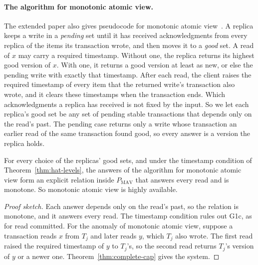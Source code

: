 \paragraph{The algorithm for monotonic atomic view.}
The extended paper also gives pseudocode for monotonic atomic
view~\cite[App.~B]{bailis2013hatextended}.  A replica keeps a write in a
\emph{pending} set until it has received acknowledgments from every replica of
the items its transaction wrote, and then moves it to a \emph{good} set.  A
read of $x$ may carry a required timestamp.  Without one, the replica returns
its highest good version of $x$.  With one, it returns a good version at least
as new, or else the pending write with exactly that timestamp.  After each
read, the client raises the required timestamp of every item that the
returned write's transaction also wrote, and it clears these timestamps when
the transaction ends.  Which acknowledgments a replica has received is not
fixed by the input.  So we let each replica's good set be any set of pending
stable transactions that depends only on the read's past.  The pending case
returns only a write whose transaction an earlier read of the same transaction
found good, so every answer is a version the replica holds.

\begin{proposition}
\label{prop:hat-mav-algorithm}
For every choice of the replicas' good sets, and under the timestamp condition
of Theorem~\ref{thm:hat-levels}, the answers of the algorithm for monotonic
atomic view form an explicit relation inside $P_{\mathrm{MAV}}$ that answers
every read and is monotone.  So monotonic atomic view is highly available.
\end{proposition}

\begin{proof}[Proof sketch]
Each answer depends only on the read's past, so the relation is monotone, and
it answers every read.  The timestamp condition rules out G1c, as for read
committed.  For the anomaly of monotonic atomic view, suppose a transaction
reads $x$ from $T_j$ and later reads $y$, which $T_j$ also wrote.  The first
read raised the required timestamp of $y$ to $T_j$'s, so the second read
returns $T_j$'s version of $y$ or a newer one.  Theorem~\ref{thm:complete-cap}
gives the system.
\end{proof}


